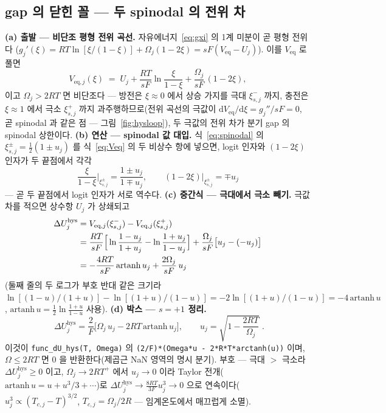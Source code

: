 \documentclass[11pt,a4paper]{article}
\newcommand{\dd}{\mathrm{d}}
\newcommand{\eq}{\mathrm{eq}}
\newcommand{\hys}{\mathrm{hys}}
\newcommand{\code}[1]{\texttt{#1}}
\begin{document}
\subsection{gap 의 닫힌 꼴 — 두 spinodal 의 전위 차}
\textbf{(a) 출발 — 비단조 평형 전위 곡선.} 자유에너지~\eqref{eq:gxi} 의 1계 미분이 곧 평형 전위다
($g_j'(\xi)=RT\ln[\xi/(1-\xi)]+\Omega_j(1-2\xi)=sF(V_\eq-U_j)$). 이를 $V_\eq$ 로 풀면
\begin{equation}
V_{\eq,j}(\xi)\;=\;U_j+\frac{RT}{sF}\ln\frac{\xi}{1-\xi}+\frac{\Omega_j}{sF}\,(1-2\xi),
\label{eq:Veq}
\end{equation}
이고 $\Omega_j>2RT$ 면 비단조다 — 방전은 $\xi\!\approx\!0$ 에서 상승 가지를 극대 $\xi_{s,j}^-$ 까지, 충전은 $\xi\!\approx\!1$
에서 극소 $\xi_{s,j}^+$ 까지 과주행하므로(전위 곡선의 극값이 $\dd V_\eq/\dd\xi=g_j''/sF=0$, 곧 spinodal 과 같은 점 —
그림~\ref{fig:hysloop}), 두 극값의 전위 차가 분기 gap 의 spinodal 상한이다. \textbf{(b) 연산 — spinodal 값 대입.}
식~\eqref{eq:spinodal} 의 $\xi_{s,j}^\pm=\tfrac12(1\pm u_j)$ 를 식~\eqref{eq:Veq} 의 두 비상수 항에 넣으면, logit 인자와
$(1-2\xi)$ 인자가 두 끝점에서 각각
\begin{equation}
\frac{\xi}{1-\xi}\bigg|_{\xi_{s,j}^\pm}=\frac{1\pm u_j}{1\mp u_j},
\qquad
(1-2\xi)\big|_{\xi_{s,j}^\pm}=\mp u_j
\label{eq:hyssub}
\end{equation}
— 곧 두 끝점에서 logit 인자가 서로 역수다. \textbf{(c) 중간식 — 극대에서 극소 빼기.} 극값 차를 적으면 상수항 $U_j$ 가
상쇄되고
\begin{align}
\Delta U_j^\hys
&=V_{\eq,j}(\xi_{s,j}^-)-V_{\eq,j}(\xi_{s,j}^+)\notag\\
&=\frac{RT}{sF}\Big[\ln\frac{1-u_j}{1+u_j}-\ln\frac{1+u_j}{1-u_j}\Big]
+\frac{\Omega_j}{sF}\big[u_j-(-u_j)\big]\notag\\
&=-\frac{4RT}{sF}\,\mathrm{artanh}\,u_j+\frac{2\Omega_j}{sF}\,u_j
\label{eq:hysdiff}
\end{align}
(둘째 줄의 두 로그가 부호 반대 같은 크기라 $\ln[(1-u)/(1+u)]-\ln[(1+u)/(1-u)]=-2\ln[(1+u)/(1-u)]=-4\,\mathrm{artanh}\,u$,
$\mathrm{artanh}\,u=\tfrac12\ln\tfrac{1+u}{1-u}$ 사용). \textbf{(d) 박스 — $s=+1$ 정리.}
\begin{equation}
\boxed{\;\Delta U_j^\hys
=\frac{2}{F}\Big[\Omega_j\,u_j-2RT\,\mathrm{artanh}\,u_j\Big],
\qquad u_j=\sqrt{1-\frac{2RT}{\Omega_j}}\;.}
\label{eq:dUhys}
\end{equation}
이것이 \code{func\_dU\_hys(T, Omega)} 의 \code{(2/F)*(Omega*u - 2*R*T*arctanh(u))} 이며, $\Omega\le2RT$ 면 $0$ 을
반환한다(제곱근 NaN 영역의 명시 분기). 부호 — 극대 $>$ 극소라 $\Delta U_j^\hys\ge0$ 이고, $\Omega_j\to2RT^+$ 에서
$u_j\to0$ 이라 Taylor 전개($\mathrm{artanh}\,u=u+u^3/3+\cdots$)로 $\Delta U_j^\hys\to\frac{8RT}{3F}u_j^3\to0$ 으로
연속이다($u_j^3\propto(T_{c,j}-T)^{3/2}$, $T_{c,j}=\Omega_j/2R$ — 임계온도에서 매끄럽게 소멸).
\end{document}

